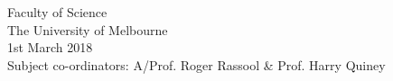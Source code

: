 \begin{titlepage}
\begin{center}
\vspace{1.0cm}

Faculty of Science\\
The University of Melbourne
\\[0.5cm]

{\large 1st March 2018}
\\[1.5cm]

Subject co-ordinators: A/Prof. Roger Rassool \& Prof. Harry Quiney
\\[0.8cm]


\end{center}
\end{titlepage}
